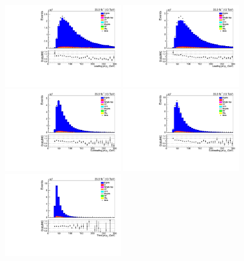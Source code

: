 \begin{figure}[!ht]
\centering
\includegraphics[width=0.45\textwidth]{figs/background-estimation/plots/unblinded/DY_control_old_prompt_ee_DYamcatnlo/leadingJetPt_SingleTop_wMass_ee.pdf}
\includegraphics[width=0.45\textwidth]{figs/background-estimation/plots/unblinded/DY_control_old_prompt_mumu_DYamcatnlo/leadingJetPt_SingleTop_wMass_mumu.pdf}
\\
\includegraphics[width=0.45\textwidth]{figs/background-estimation/plots/unblinded/DY_control_old_prompt_ee_DYamcatnlo/secondJetPt_SingleTop_wMass_ee.pdf}
\includegraphics[width=0.45\textwidth]{figs/background-estimation/plots/unblinded/DY_control_old_prompt_mumu_DYamcatnlo/secondJetPt_SingleTop_wMass_mumu.pdf}
\\
\includegraphics[width=0.45\textwidth]{figs/background-estimation/plots/unblinded/DY_control_old_prompt_ee_DYamcatnlo/thirdJetPt_SingleTop_wMass_ee.pdf}

\end{figure}
